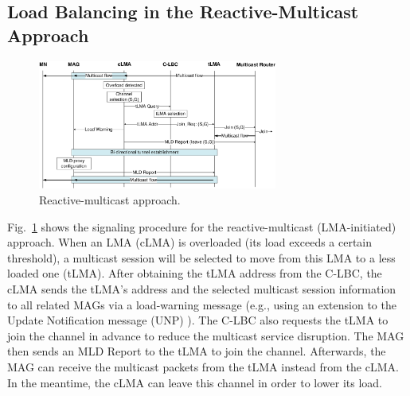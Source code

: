 \subsection{Load Balancing in the Reactive-Multicast Approach}
\begin{figure}[h!] 
 \begin{center} 
 \includegraphics[width=0.70\textwidth]{./Part2/Chapter5/figures/reactive_multicast.eps} 
    \caption[The reactive-multicast load balancing approach.]{Reactive-multicast approach.}
        \label{fig:reactive_multicast}
  \end{center} 
\end{figure}

Fig.~\ref{fig:reactive_multicast} shows the signaling procedure for the reactive-multicast (LMA-initiated) approach. When an LMA (cLMA) is overloaded (its load exceeds a certain threshold), a multicast session will be selected to move from this LMA to a less loaded one (tLMA).
After obtaining the tLMA address from the C-LBC, the cLMA sends the tLMA's address and the selected multicast session information to all related MAGs via a load-warning message (e.g., using an extension to the Update Notification message (UNP) \cite{update_notification}). The C-LBC also requests the tLMA to join the channel in advance to reduce the multicast service disruption. The MAG then sends an MLD Report to the tLMA to join the channel. Afterwards, the MAG can receive the multicast packets from the tLMA instead from the cLMA. In the meantime, the cLMA can leave this channel in order to lower its load.
